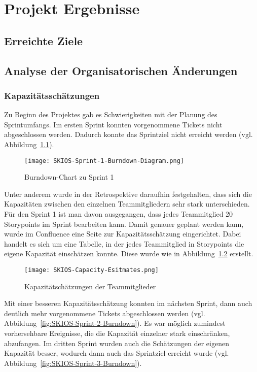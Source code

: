 
\chapter{Projekt Ergebnisse}\label{proj_ergebnisse}

\section{Erreichte Ziele}

\section{Analyse der Organisatorischen Änderungen} \label{orga_changes}

\subsection{Kapazitätsschätzungen}

Zu Beginn des Projektes gab es Schwierigkeiten mit der Planung des Sprintumfangs.
Im ersten Sprint konnten vorgenommene Tickets nicht abgeschlossen werden. 
Dadurch konnte das Sprintziel nicht erreicht werden (vgl. Abbildung~\ref{fig:SKIOS-Sprint-1-Burndown}).

\begin{figure}[h]
    \texttt{[image: SKIOS-Sprint-1-Burndown-Diagram.png]}
    \caption{Burndown-Chart zu Sprint 1}
    \label{fig:SKIOS-Sprint-1-Burndown}
\end{figure}

Unter anderem wurde in der Retrospektive daraufhin festgehalten, 
dass sich die Kapazitäten zwischen den einzelnen Teammitgliedern sehr stark unterschieden.
Für den Sprint 1 ist man davon ausgegangen, dass jedes Teammitglied 20 Storypoints im Sprint bearbeiten kann.
Damit genauer geplant werden kann, wurde im Confluence eine Seite zur Kapazitätsschätzung eingerichtet.
Dabei handelt es sich um eine Tabelle, in der jedes Teammitglied in Storypoints die eigene Kapazität einschätzen konnte.
Diese wurde wie in Abbildung~\ref{fig:Capacitytable} erstellt. 

\begin{figure}[h]
    \texttt{[image: SKIOS-Capacity-Esitmates.png]}
    \caption{Kapazitätschätzungen der Teammitglieder}
    \label{fig:Capacitytable}
\end{figure}

Mit einer besseren Kapazitätsschätzung konnten im nächsten Sprint, dann auch deutlich mehr vorgenommene Tickets abgeschlossen werden (vgl. Abbildung~\ref{fig:SKIOS-Sprint-2-Burndown}).
Es war möglich zumindest vorhersehbare Ereignisse, die die Kapazität einzelner stark einschränken, abzufangen.
Im dritten Sprint wurden auch die Schätzungen der eigenen Kapazität besser, wodurch dann auch das Sprintziel erreicht wurde (vgl. Abbildung~\ref{fig:SKIOS-Sprint-3-Burndown}).

